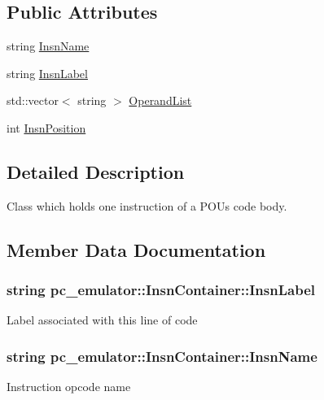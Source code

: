 \subsection*{Public Attributes}
\begin{DoxyCompactItemize}
\item 
string \hyperlink{classpc__emulator_1_1InsnContainer_a4f55c833c6ab4088ccb9be1e35638da9}{Insn\+Name}
\item 
string \hyperlink{classpc__emulator_1_1InsnContainer_a4fef8845e6a7f568884044b8db0abce5}{Insn\+Label}
\item 
std\+::vector$<$ string $>$ \hyperlink{classpc__emulator_1_1InsnContainer_aa6165ed97e70f77e2cf877e173fbb277}{Operand\+List}
\item 
int \hyperlink{classpc__emulator_1_1InsnContainer_a682a1868ddc3693127e0903676a3d137}{Insn\+Position}
\end{DoxyCompactItemize}


\subsection{Detailed Description}
Class which holds one instruction of a P\+OU\textquotesingle{}s code body. 

\subsection{Member Data Documentation}
\subsubsection[{\texorpdfstring{Insn\+Label}{InsnLabel}}]{\setlength{\rightskip}{0pt plus 5cm}string pc\+\_\+emulator\+::\+Insn\+Container\+::\+Insn\+Label}\hypertarget{classpc__emulator_1_1InsnContainer_a4fef8845e6a7f568884044b8db0abce5}{}\label{classpc__emulator_1_1InsnContainer_a4fef8845e6a7f568884044b8db0abce5}
Label associated with this line of code 
\subsubsection[{\texorpdfstring{Insn\+Name}{InsnName}}]{\setlength{\rightskip}{0pt plus 5cm}string pc\+\_\+emulator\+::\+Insn\+Container\+::\+Insn\+Name}\hypertarget{classpc__emulator_1_1InsnContainer_a4f55c833c6ab4088ccb9be1e35638da9}{}\label{classpc__emulator_1_1InsnContainer_a4f55c833c6ab4088ccb9be1e35638da9}
Instruction opcode name 
